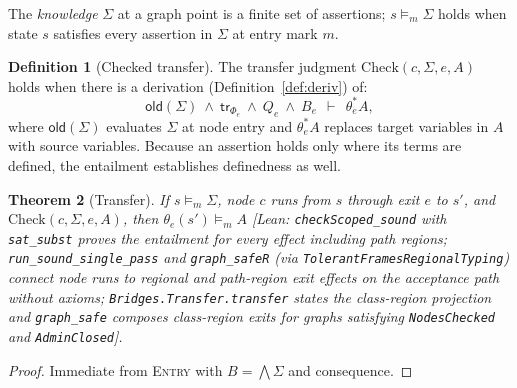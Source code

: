 \documentclass[10pt,a4paper]{article}
\newtheorem{theorem}{Theorem}
\theoremstyle{definition}
\newtheorem{definition}[theorem]{Definition}
\theoremstyle{remark}
\newcommand{\kw}[1]{\mathsf{#1}}
\newcommand{\old}{\kw{old}}
\newcommand{\lean}[1]{\texttt{\small #1}}
\newcommand{\status}[1]{\textsf{\small[#1]}}
\begin{document}
The \emph{knowledge} $\Sigma$ at a graph point is a finite set of
assertions; $s\models_m\Sigma$ holds when state $s$ satisfies every
assertion in $\Sigma$ at entry mark $m$.

\begin{definition}[Checked transfer]\label{def:transfer}
The transfer judgment $\mathrm{Check}(c,\Sigma,e,A)$ holds when there is
a derivation (Definition~\ref{def:deriv}) of:
{\small\begin{displaymath}
\old(\Sigma)\ \wedge\ \kw{tr}_{\Phi_e}\ \wedge\ Q_e\ \wedge\ B_e\ \ \vdash\ \ \theta_e^{*}A,
\end{displaymath}}
where $\old(\Sigma)$ evaluates $\Sigma$ at node entry and $\theta_e^{*}A$
replaces target variables in $A$ with source variables. Because an
assertion holds only where its terms are defined, the entailment
establishes definedness as well.
\end{definition}

\begin{theorem}[Transfer]\label{thm:transfer}
If $s\models_m\Sigma$, node $c$ runs from $s$ through exit $e$ to $s'$,
and $\mathrm{Check}(c,\Sigma,e,A)$, then $\theta_e(s')\models_m A$
\status{Lean: \lean{checkScoped\_sound} with \lean{sat\_subst} proves the entailment for every effect including path regions; \lean{run\_sound\_single\_pass} and \lean{graph\_safeR} (via \lean{TolerantFramesRegionalTyping}) connect node runs to regional and path-region exit effects on the acceptance path without axioms; \lean{Bridges.Transfer.transfer} states the class-region projection and \lean{graph\_safe} composes class-region exits for graphs satisfying \lean{NodesChecked} and \lean{AdminClosed}}.
\end{theorem}
\begin{proof}
Immediate from \textsc{Entry} with $B=\bigwedge\Sigma$ and consequence.
\end{proof}
\end{document}

